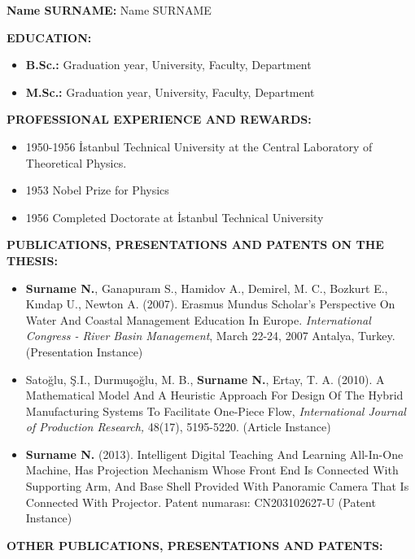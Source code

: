 
\textbf{Name SURNAME:} Name SURNAME \\
\vspace{-6pt}

\textbf{EDUCATION:} 

\begin{itemize}
  \item \textbf{B.Sc.:} Graduation year, University, Faculty, Department
  \item \textbf{M.Sc.:} Graduation year, University, Faculty, Department
\end{itemize}

\textbf{PROFESSIONAL EXPERIENCE AND REWARDS:}   

\begin{itemize}
  \item 1950-1956 İstanbul Technical University at the Central Laboratory of Theoretical Physics.
  \item 1953 Nobel Prize for Physics
  \item 1956 Completed Doctorate at İstanbul Technical University
\end{itemize}

\textbf{PUBLICATIONS, PRESENTATIONS AND PATENTS ON THE THESIS:} 

\begin{itemize}

   \item {\bf Surname N.}, Ganapuram S., Hamidov A., Demirel, M. C., Bozkurt E., Kındap U., Newton A.
   (2007). Erasmus Mundus Scholar's Perspective On Water And Coastal
   Management Education In Europe. 
   \textit{International Congress - River Basin Management}, 
   March 22-24, 2007 Antalya, Turkey. (Presentation Instance)

   \item Satoğlu, Ş.I., Durmuşoğlu, M. B., {\bf Surname N.}, Ertay, T. A. (2010). A Mathematical Model 
   And A Heuristic Approach For Design Of The Hybrid Manufacturing Systems 
   To Facilitate One-Piece Flow, 
   \textit{International Journal of Production Research,}
   48(17), 5195-5220. (Article Instance)

   \item  {\bf Surname N.} (2013). Intelligent Digital Teaching And Learning All-In-One Machine,
   Has Projection Mechanism Whose Front End Is Connected With Supporting
   Arm, And Base Shell Provided With Panoramic Camera That Is Connected With
   Projector. Patent numarası: CN203102627-U (Patent Instance)
   
\end{itemize}


\textbf{OTHER PUBLICATIONS, PRESENTATIONS AND PATENTS:} 

